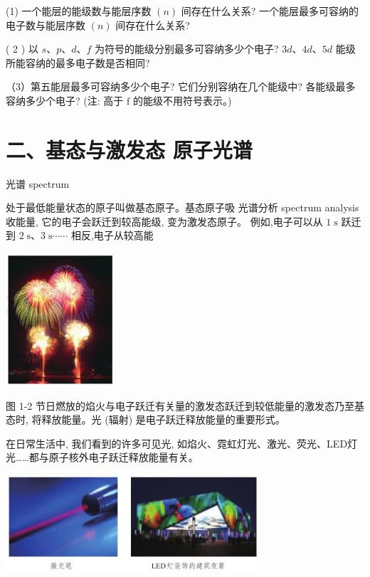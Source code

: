\documentclass[10pt]{article}
\begin{document}
(1) 一个能层的能级数与能层序数 \(\left( n\right)\) 间存在什么关系? 一个能层最多可容纳的电子数与能层序数 \(\left( n\right)\) 间存在什么关系?

( 2 ) 以 \(s\text{、}p\text{、}d\text{、}f\) 为符号的能级分别最多可容纳多少个电子? \({3d}\text{、}{4d}\text{、}{5d}\) 能级所能容纳的最多电子数是否相同?

（3）第五能层最多可容纳多少个电子? 它们分别容纳在几个能级中? 各能级最多容纳多少个电子? (注: 高于 \(\mathrm{f}\) 的能级不用符号表示。)

\section*{二、基态与激发态 原子光谱}

光谱 spectrum

处于最低能量状态的原子叫做基态原子。基态原子吸 光谱分析 spectrum analysis 收能量, 它的电子会跃迁到较高能级, 变为激发态原子。 例如,电子可以从 \(1\mathrm{\;s}\) 跃迁到 \(2\mathrm{\;s}\text{、}3\mathrm{\;s}\cdots \cdots\) 相反,电子从较高能

\begin{mdframed}

\begin{center}
\includegraphics[max width=0.3\textwidth]{images/0190e026-5a11-7df7-bd27-54d09026ba7a_10_200042.jpg}
\end{center}

图 1-2 节日燃放的焰火与电子跃迁有关量的激发态跃迁到较低能量的激发态乃至基态时, 将释放能量。光 (辐射) 是电子跃迁释放能量的重要形式。

\end{mdframed}

在日常生活中, 我们看到的许多可见光, 如焰火、霓虹灯光、激光、荧光、LED灯光……都与原子核外电子跃迁释放能量有关。

\begin{center}
\includegraphics[max width=0.7\textwidth]{images/0190e026-5a11-7df7-bd27-54d09026ba7a_10_117719.jpg}
\end{center}
\end{document}
